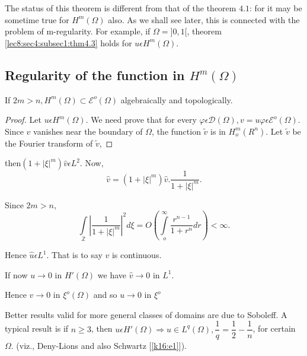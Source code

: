 \begin{remark*}%
  The status of this theorem is different from that of the theorem
  $4.1$: for it may be sometime true for $H^m(\Omega)$ also. As we shall
  see later, this is connected with the problem of m-regularity. For
  example, if $\Omega = ]0, 1[$, theorem \ref{lec8:sec4:subsec1:thm4.3} holds for $u \epsilon
  H^m(\Omega)$. 
\end{remark*}

\subsection{Regularity of the function in \texorpdfstring{$H^m(\Omega)$}{Hm(Omega)}}\label{lec8:sec4:subsec2}%

\begin{theorem}\label{lec8:sec4:subsec2:thm4.4}%
 If $2m >n, H^m (\Omega) \subset \mathscr{E}^o (\Omega)$ algebraically
 and topologically. 
\end{theorem}

\begin{proof}
Let $u \epsilon H^m(\Omega)$. We need prove that for every $\varphi
\epsilon \mathscr{D} (\Omega), v = u \varphi \epsilon
\mathscr{E}^o (\Omega)$. Since $v$ vanishes near the boundary of
$\Omega$, the function $\tilde{v}$ is in $H^m_o(R^n)$. Let
$\tilde{v}$  be the Fourier transform of $\tilde{v}$, 
\end{proof}
then\pageoriginale $(1 + |\xi |^m) \hat{v} \epsilon L^2$. Now,
$$
\hat{v} = (1+ |\xi|^m) \hat{v}. \frac{1}{1 + |\xi|^m}.
$$

Since $2m > n$,
$$
\int\limits_{\mathbb{Z}} |\frac{1}{1 + |\xi|^m}|^2 d \xi = O
(\int\limits_{o}^{\infty} \frac{r^{n-1}}{1+ r^n} dr)< \infty. 
$$

Hence $\hat{u} \epsilon L^1$. That is to say $v$ is continuous.

If now $u \to 0$ in $H' (\Omega)$ we have $\hat{v} \to 0$ in $L^1$.

Hence $v \to 0$ in $\xi^o (\Omega)$ and so $u \to 0$ in $\xi^o$

\begin{remark*}
  Better results valid for more general classes of domains are due to
  Soboleff. A typical result is if $n \geq 3$, then $u \epsilon H'
  (\Omega) \Longrightarrow u \in L^q (\Omega) , \dfrac{1}{q} = \dfrac{1}{2}-
  \dfrac{1}{n}$, for certain $\Omega$. (viz., Deny-Lions \cite{k7} and also
  Schwartz [\ref{k16:e1}]). 
\end{remark*}

